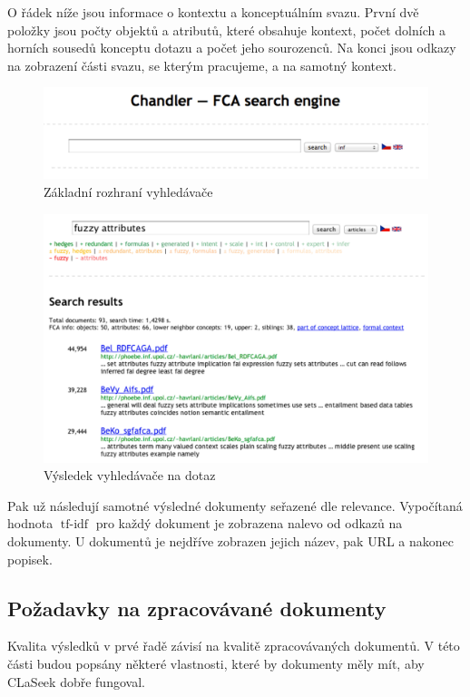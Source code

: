 \documentclass[12pt]{article}
\newcommand{\name}{CLaSeek}
\newcommand{\ssection}[1]{\subsection{#1}}
\DeclareMathOperator{\tfidf}{tf-idf}
\begin{document}
O řádek níže jsou informace o kontextu a konceptuálním svazu. První dvě položky jsou počty objektů a atributů, které obsahuje kontext, počet dolních a horních sousedů konceptu dotazu a počet jeho sourozenců. Na konci jsou odkazy na zobrazení části svazu, se kterým pracujeme, a na samotný kontext.

\begin{figure}
  \centering
  \includegraphics[width=14cm]{obrazky/gui-zakladni.pdf}
  \caption{Základní rozhraní vyhledávače}
  \label{fig.gui.empty}
\end{figure}

\begin{figure}
  \centering
  \includegraphics[width=14cm]{obrazky/gui-result1.pdf}
  \caption{Výsledek vyhledávače na dotaz }
  \label{fig.gui.result1}
\end{figure}

Pak už následují samotné výsledné dokumenty seřazené dle relevance. Vypočítaná hodnota $\tfidf$ pro každý dokument je zobrazena nalevo od odkazů na dokumenty. U dokumentů je nejdříve zobrazen jejich název, pak URL a nakonec popisek. 

\ssection{Požadavky na zpracovávané dokumenty}
Kvalita výsledků v prvé řadě závisí na kvalitě zpracovávaných dokumentů. V této části budou popsány některé vlastnosti, které by dokumenty měly mít, aby \name{} dobře fungoval. 
\end{document}
